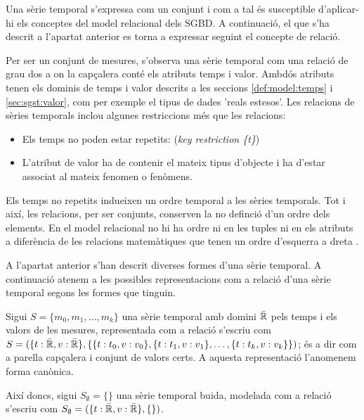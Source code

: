 Una sèrie temporal s'expressa com un conjunt i com a tal és
susceptible d'aplicar-hi els conceptes del model relacional dels
SGBD. A continuació, el que s'ha descrit a l'apartat anterior es torna
a expressar seguint el concepte de relació.


Per ser un conjunt de mesures, s'observa una sèrie temporal com una
relació de grau dos a on la capçalera conté els atributs temps i
valor. Ambdós atributs tenen els dominis de temps i valor descrits a
les seccions \ref{def:model:temps} i \ref{sec:sgst:valor}, com per
exemple el tipus de dades 'reals estesos'. Les relacions de sèries
temporals inclou algunes restriccions més que les relacions:

\begin{itemize}
\item Els temps no poden estar repetits: (\emph{key restriction \{t\}})
\item L'atribut de valor ha de contenir el mateix tipus d'objecte i ha
  d'estar associat al mateix fenomen o fenòmens.
\end{itemize}

Els temps no repetits indueixen un ordre temporal a les sèries
temporals. Tot i així, les relacions, per ser conjunts, conserven la
no definció d'un ordre dels elements. En el model relacional no hi ha
ordre ni en les tuples ni en els atributs a diferència de les
relacions matemàtiques que tenen un ordre d'esquerra a
dreta \parencite[sec.\ 5.3]{date:introduction}.



A l'apartat anterior s'han descrit diverses formes d'una sèrie
temporal.  A continuació atenem a les possibles representacions com a
relació d'una sèrie temporal segons les formes que tinguin.




\begin{definition}
  Sigui $S = \{ m_0, m_1 , \dotsc, m_k \}$ una sèrie temporal amb
  domini $\bar{\mathbb{R}{}}$ pels temps i els valors de les mesures,
  representada com a relació s'escriu com $S = ( \{t: \bar{\mathbb{R}{}}, v:
  \bar{\mathbb{R}{}}\}, \{ \{t:t_0,v:v_0\}, \{t:t_1,v:v_1\}, \dotsc,
  \{t:t_k,v:v_k\} \} )$; és a dir com a parella capçalera i conjunt de
  valors certs. A aquesta representació l'anomenem forma canònica.

  Així doncs, sigui $S_{\emptyset} = \{ \}$ una sèrie temporal buida,
  modelada com a relació s'escriu com $S_{\emptyset} = ( \{t:
  \bar{\mathbb{R}{}}, v: \bar{\mathbb{R}{}}\}, \{ \} )$.
\end{definition}


